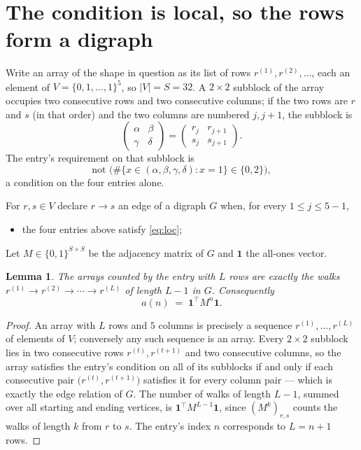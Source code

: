 \documentclass[11pt,a4paper]{article}
\theoremstyle{plain}
\newtheorem{lemma}[theorem]{Lemma}
\theoremstyle{definition}
\begin{document}
\section{The condition is local, so the rows form a digraph}

Write an array of the shape in question as its list of rows
$r^{(1)},r^{(2)},\dots$, each an element of
$V=\{0,1,\dots,1\}^{5}$, so $|V|=S=32$. A $2\times2$ subblock of the array
occupies two consecutive rows and two consecutive columns; if the two rows are $r$
and $s$ (in that order) and the two columns are numbered $j,j+1$,
the subblock is
\[
\begin{pmatrix}\alpha&\beta\\\gamma&\delta\end{pmatrix}=\begin{pmatrix}r_j&r_{j+1}\\s_j&s_{j+1}\end{pmatrix}.
\]
The entry's requirement on that subblock is
\begin{equation}\label{eq:loc}
\text{not }\bigl(\#\{x\in(\alpha,\beta,\gamma,\delta):x=1\}\in\{0,2\}\bigr),
\end{equation}
a condition on the four entries alone.

For $r,s\in V$ declare $r\to s$ an edge of a digraph $G$ when, for every
$1\le j\le 5-1$,
\begin{itemize}
\item the four entries above satisfy \eqref{eq:loc};

\end{itemize}
Let $M\in\{0,1\}^{S\times S}$ be the adjacency matrix of $G$ and $\mathbf{1}$ the
all-ones vector.

\begin{lemma}\label{lem:walk}
The arrays counted by the entry with $L$ rows are exactly the walks
$r^{(1)}\to r^{(2)}\to\cdots\to r^{(L)}$ of length $L-1$ in $G$. Consequently
\[
a(n)\;=\;\mathbf{1}^{\!\top}M^{n}\mathbf{1} .
\]
\end{lemma}

\begin{proof}
An array with $L$ rows and $5$ columns is precisely a sequence
$r^{(1)},\dots,r^{(L)}$ of elements of $V$; conversely any such sequence is an array.
Every $2\times2$ subblock lies in two consecutive rows $r^{(t)},r^{(t+1)}$ and two
consecutive columns, so the array satisfies the entry's condition on all of its subblocks
if and only if each consecutive pair $\bigl(r^{(t)},r^{(t+1)}\bigr)$ satisfies it for
every column pair --- which is exactly the edge relation of $G$. The number of walks of
length $L-1$, summed over all starting and ending vertices, is
$\mathbf{1}^{\!\top}M^{L-1}\mathbf{1}$, since $(M^{k})_{r,s}$ counts the walks of
length $k$ from $r$ to $s$. The entry's index $n$ corresponds to $L=n+1$ rows.
\end{proof}
\end{document}
